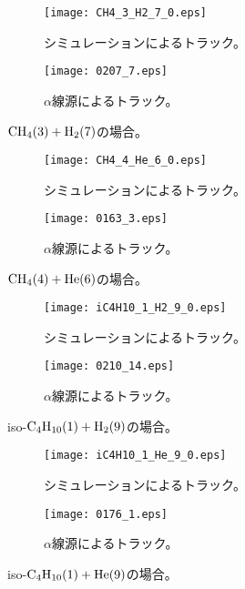 \documentclass[../master]{subfiles}
\begin{document}
\begin{figure}
  \centering
  \begin{subfigure}{0.48\columnwidth}
    \centering
    \texttt{[image: CH4\_3\_H2\_7\_0.eps]}
    \caption{シミュレーションによるトラック。}
  \end{subfigure}
  \begin{subfigure}{0.48\columnwidth}
    \centering
    \texttt{[image: 0207\_7.eps]}
    \caption{$\alpha$線源によるトラック。}
  \end{subfigure}
  \caption{$\rm CH_{4} (3) + H_{2} (7)$の場合。}
  \label{fig::track_comp_ch4_h2}
\end{figure}
\begin{figure}
  \centering
  \begin{subfigure}{0.48\columnwidth}
    \centering
    \texttt{[image: CH4\_4\_He\_6\_0.eps]}
    \caption{シミュレーションによるトラック。}
  \end{subfigure}
  \begin{subfigure}{0.48\columnwidth}
    \centering
    \texttt{[image: 0163\_3.eps]}
    \caption{$\alpha$線源によるトラック。}
  \end{subfigure}
  \caption{$\rm CH_{4} (4) + He (6)$の場合。}
  \label{fig::track_comp_ch4_he}
\end{figure}
\begin{figure}
  \centering
  \begin{subfigure}{0.48\columnwidth}
    \centering
    \texttt{[image: iC4H10\_1\_H2\_9\_0.eps]}
    \caption{シミュレーションによるトラック。}
  \end{subfigure}
  \begin{subfigure}{0.48\columnwidth}
    \centering
    \texttt{[image: 0210\_14.eps]}
    \caption{$\alpha$線源によるトラック。}
  \end{subfigure}
  \caption{iso-$\rm C_{4}H_{10} (1) + H_{2} (9)$の場合。}
  \label{fig::track_comp_ic4h10_h2}
\end{figure}
\begin{figure}
  \centering
  \begin{subfigure}{0.48\columnwidth}
    \centering
    \texttt{[image: iC4H10\_1\_He\_9\_0.eps]}
    \caption{シミュレーションによるトラック。}
  \end{subfigure}
  \begin{subfigure}{0.48\columnwidth}
    \centering
    \texttt{[image: 0176\_1.eps]}
    \caption{$\alpha$線源によるトラック。}
  \end{subfigure}
  \caption{iso-$\rm C_{4}H_{10} (1) + He (9)$の場合。}
  \label{fig::track_comp_ic4h10_he}
\end{figure}
\end{document}
